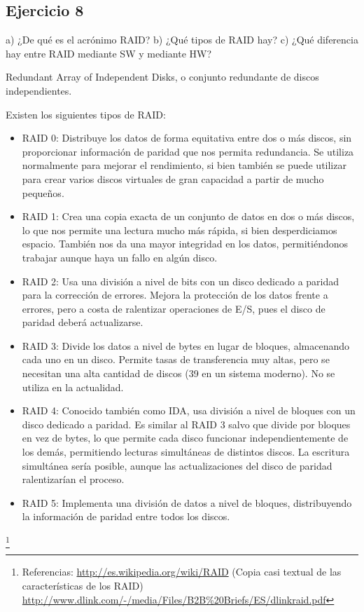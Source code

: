 \documentclass[a4paper, 11pt]{article} %
\begin{document}
\subsection*{Ejercicio 8}
a) ¿De qué es el acrónimo RAID? b) ¿Qué tipos de RAID hay? c) ¿Qué
diferencia hay entre RAID mediante SW y mediante HW? 

Redundant Array of Independent Disks, o conjunto redundante de discos independientes. 

Existen los siguientes tipos de RAID: 
\begin{itemize}
\item RAID 0: Distribuye los datos de forma equitativa entre dos o más discos, sin proporcionar información de paridad que nos permita redundancia. Se utiliza normalmente para mejorar el rendimiento, si bien también se puede utilizar para crear varios discos virtuales de gran capacidad a partir de mucho pequeños. 
\item RAID 1: Crea una copia exacta de un conjunto de datos en dos o más discos, lo que nos permite una lectura mucho más rápida, si bien desperdiciamos espacio. También nos da una mayor integridad en los datos, permitiéndonos trabajar aunque haya un fallo en algún disco. 
\item RAID 2: Usa una división a nivel de bits con un disco dedicado a paridad para la corrección de errores. Mejora la protección de los datos frente a errores, pero a costa de ralentizar operaciones de E/S, pues el disco de paridad deberá actualizarse. 
\item RAID 3: Divide los datos a nivel de bytes en lugar de bloques, almacenando cada uno en un disco. Permite tasas de transferencia muy altas, pero se necesitan una alta cantidad de discos (39 en un sistema moderno). No se utiliza en la actualidad. 
\item RAID 4: Conocido también como IDA, usa división a nivel de bloques con un disco dedicado a paridad. Es similar al RAID 3 salvo que divide por bloques en vez de bytes, lo que permite cada disco funcionar independientemente de los demás, permitiendo lecturas simultáneas de distintos discos. La escritura simultánea sería posible, aunque las actualizaciones del disco de paridad ralentizarían el proceso. 
\item RAID 5: Implementa una división de datos a nivel de bloques, distribuyendo la información de paridad entre todos los discos. 
\end{itemize}

\footnote{Referencias: \url{http://es.wikipedia.org/wiki/RAID} (Copia casi textual de las características de los RAID) \\ \url{http://www.dlink.com/-/media/Files/B2B\%20Briefs/ES/dlinkraid.pdf}}
\end{document}

